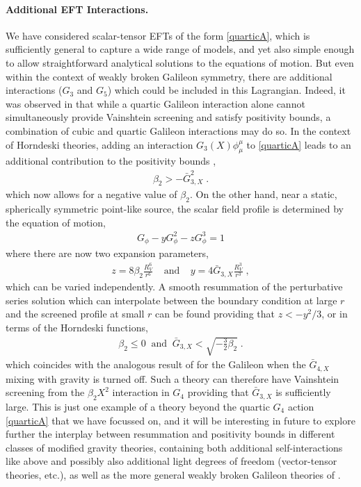 \documentclass[11pt]{article}
\begin{document}
\paragraph{Additional EFT Interactions.}
We have considered scalar-tensor EFTs of the form \eqref{quarticA}, which is sufficiently general to capture a wide range of models, and yet also simple enough to allow straightforward analytical solutions to the equations of motion.  
But even within the context of weakly broken Galileon symmetry, there are additional interactions ($G_3$ and $G_5$) which could be included in this Lagrangian. 
Indeed, it was observed in \cite{deRham:2017imi} that while a quartic Galileon interaction alone cannot simultaneously provide Vainshtein screening and satisfy positivity bounds, a combination of cubic and quartic Galileon interactions may do so. In the context of Horndeski theories, adding an interaction $G_3  (X) \phi^\mu_\mu$ to \eqref{quarticA} leads to an additional contribution to the positivity bounds \cite{Melville:2019wyy},
\begin{align}
 \beta_2  >  - \bar{G}_{3,X}^2 \; . 
\end{align}
which now allows for a negative value of $\beta_2$. 
On the other hand, near a static, spherically symmetric point-like source, the scalar field profile is determined by the equation of motion, 
\begin{align}
 G_\phi - y G_\phi^2 - z G_{\phi}^{3} = 1 
\end{align}
where there are now two expansion parameters,
\begin{align}
 z = 8 \beta_2 \frac{R_V^6}{r^6} \;\;\;\; \text{and} \;\;\;\; y = 4 \bar{G}_{3,X} \frac{R_V^3}{r^3} \; , 
\end{align}
which can be varied independently. A smooth resummation of the perturbative series solution which can interpolate between the boundary condition at large $r$ and the screened profile at small $r$ can be found providing that $z < - y^2 /3$, or in terms of the Horndeski functions,
\begin{align}
\beta_2 \leq 0 \;\; \text{and} \;\;  \bar{G}_{3,X} <  \sqrt{ - \tfrac{3}{2} \beta_2} \; . 
\end{align}
which coincides with the analogous result of \cite{Nicolis:2008in} for the Galileon when the $\bar{G}_{4,X}$ mixing with gravity is turned off. 
Such a theory can therefore have Vainshtein screening from the $\beta_2 X^2$ interaction in $G_4$ providing that $\bar{G}_{3,X}$ is sufficiently large. 
This is just one example of a theory beyond the quartic $G_4$ action \eqref{quarticA} that we have focussed on, and it will be interesting in future to explore further the interplay between resummation and positivity bounds in different classes of modified gravity theories, containing both additional self-interactions like above and possibly also additional light degrees of freedom (vector-tensor theories, etc.), as well as the more general weakly broken Galileon theories of \cite{Santoni:2018rrx}.
\end{document}
